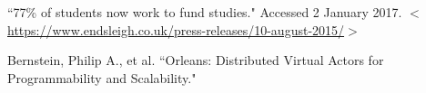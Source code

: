 \documentclass[12pt, a4paper]{article}
\begin{document}
\newpage
\begin{thebibliography}{9}
``77\% of students now work to fund studies." Accessed 2 January 2017. $<$\url{https://www.endsleigh.co.uk/press-releases/10-august-2015/}$>$

Bernstein, Philip A., et al. ``Orleans: Distributed Virtual Actors for Programmability and Scalability."

\end{thebibliography}
\end{document}
